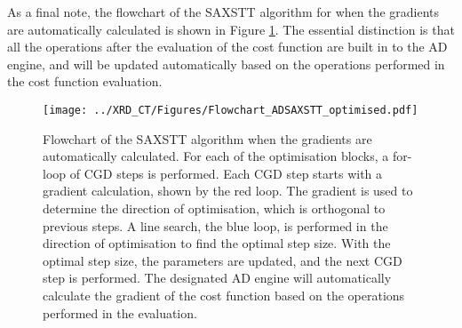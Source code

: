 As a final note, the flowchart of the SAXSTT algorithm for when the gradients are automatically calculated is shown in Figure \ref{fig:flowchart_ADSAXSTT}.
The essential distinction is that all the operations after the evaluation of the cost function are built in to the AD engine, and will be updated automatically
based on the operations performed in the cost function evaluation.

\begin{figure}
    \centering
    \texttt{[image: ../XRD\_CT/Figures/Flowchart\_ADSAXSTT\_optimised.pdf]}
    \caption[Flowchart of AD SAXSTT]{Flowchart of the SAXSTT algorithm when the gradients are automatically calculated.
        For each of the optimisation blocks, a for-loop of CGD steps is performed.
        Each CGD step starts with a gradient calculation, shown by the red loop.
        The gradient is used to determine the direction of optimisation, which is orthogonal to previous steps.
        A line search, the blue loop, is performed in the direction of optimisation to find the optimal step size.
        With the optimal step size, the parameters are updated, and the next CGD step is performed.
        The designated AD engine will automatically calculate the gradient of the cost function based on the operations performed in the evaluation.
    }
    \label{fig:flowchart_ADSAXSTT}
\end{figure}